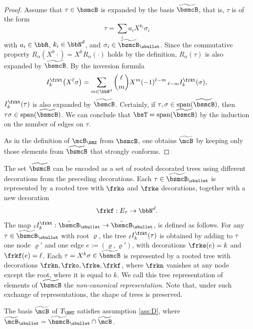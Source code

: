 \begin{proof}
Assume that $\tau\in\bsmcB$ is expanded by the basis $\widetilde{\bsmcB}$, that is, $\tau$ is of the form\vspace*{-3pt}
\[
\tau=\sum_i a_i X^{k_i}\sigma_i
\]
with $a_i\in\bbR$, $k_i\in\bbN^d$, and $\sigma_i\in\widetilde{\bsmcB}_\sbullet$. Since the commutative property $R_\alpha(X^k\cdot)=X^kR_\alpha(\cdot)$ holds by the definition, $R_\alpha(\tau)$ is also expanded by $\widetilde{\bsmcB}$. By the inversion formula\vspace*{-3pt}
\begin{align*}
I_k^\frkt\bigl(X^\ell\sigma\bigr)=\sum_{m\in\bbN^d}\binom{\ell}{m}X^m(-1)^{\ell-m}\,{}_{\ell-m}I_k^\frkt(\sigma),
\end{align*}
$I_k^\frkt(\tau)$ is also expanded by $\widetilde{\bsmcB}$. Certainly, if $\tau,\sigma\in\textrm{span}(\widetilde{\bsmcB})$, then $\tau\sigma\in\textrm{span}(\widetilde{\bsmcB})$. We can conclude that $\bsT=\textrm{span}(\widetilde{\bsmcB})$ by the induction on the number of edges on $\tau$.

As in the definition of $\mcB_\BHZ$ from $\bsmcB$, one obtains $\widetilde\mcB$ by keeping only those elements from $\widetilde{\bsmcB}$ that strongly conforms.
\end{proof}

The set $\widetilde{\bsmcB}$ can be encoded as a set of rooted decorated trees using different decorations from the preceding decorations. Each $\tau\in\widetilde{\bsmcB}_\sbullet$ is represented by a rooted tree with $\frko$ and $\frke$ decorations, together with a new decoration
\[
\frkf:E_\tau\to\bbN^d.
\]
The map ${}_{\ell}I_k^\frkt:\tilde{\bsmcB}_\sbullet\to\tilde{\bsmcB}_\sbullet$, is defined as follows. For any $\tau\in\widetilde{\bsmcB}_\sbullet$ with root $\varrho$, the tree ${}_{\ell}I_k^\frkt(\tau)$ is obtained by adding to $\tau$ one node $\varrho'$ and one edge $e:=(\varrho,\varrho')$, with decorations $\frke(e)=k$ and $\frkf(e)=\ell$. Each $\tau=X^k\sigma\in\widetilde{\bsmcB}$ is represented by a rooted tree with decorations $\frkn,\frko,\frke,\frkf$, where $\frkn$ vanishes at any node except the root, where it is equal to $k$. We call this tree representation of elements of $\widetilde{\bsmcB}$ the \textit{non-canonical representation}. Note that, under such exchange of representations, the shape of trees is preserved.

\begin{thm} %
The basis $\widetilde{\mcB}$ of $T_{\BHZ}$ satisfies assumption \eqref{ass:D}, where $\widetilde{\mcB}_\sbullet=\widetilde{\bsmcB}_\sbullet\cap\widetilde{\mcB}$.
\end{thm}

